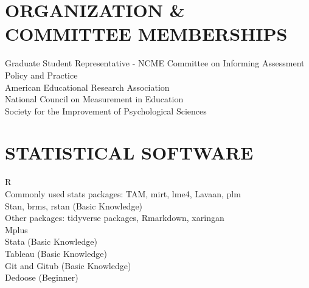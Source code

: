 \documentclass[12pt, oneside,]{memoir}
\begin{document}
\hypertarget{organization-committee-memberships}{%
\section{ORGANIZATION \& COMMITTEE
MEMBERSHIPS}\label{organization-committee-memberships}}

\noindent Graduate Student Representative - NCME Committee on Informing Assessment Policy and Practice\\
American Educational Research Association\\
National Council on Measurement in Education\\
Society for the Improvement of Psychological Sciences
\vspace{4mm}

\hypertarget{statistical-software}{%
\section{STATISTICAL SOFTWARE}\label{statistical-software}}
\noindent R\\
\hspace*{0.333em} Commonly used stats packages: TAM, mirt, lme4, Lavaan, plm\\
\hspace*{0.333em} Stan, brms, rstan (Basic Knowledge)\\
\hspace*{0.333em} Other packages: tidyverse packages, Rmarkdown, xaringan\\
\noindent Mplus\\
\noindent Stata (Basic Knowledge)\\
Tableau (Basic Knowledge)\\
Git and Gitub (Basic Knowledge)\\
Dedoose (Beginner)
\end{document}
